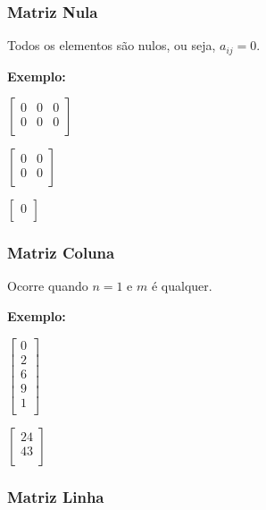 \documentclass[oneside,a4paper,12pt]{article}
\begin{document}
\subsubsection{Matriz Nula}

Todos os elementos são nulos, ou seja, $a_{ij} = 0$.

\textbf{Exemplo: }

\begin{multicols}{3}
	$
	\left[
	\begin{array}{ccc}
	0	&	0	&	0	\\
	0	&	0	&	0	\\
	\end{array}
	\right]
	$
	
	$
	\left[
	\begin{array}{cc}
	0	&	0	\\
	0	&	0	\\
	\end{array}
	\right]
	$
	
	$
	\left[
	\begin{array}{c}
	0	\\
	\end{array}
	\right]
	$
\end{multicols}

\subsubsection{Matriz Coluna}

Ocorre quando $n=1$ e $m$ é qualquer.

\textbf{Exemplo: }

\begin{multicols}{2}
	$
	\left[
	\begin{array}{c}
	0	\\
	2	\\
	6	\\
	9	\\
	1	\\
	\end{array}
	\right]
	$
	
	$
	\left[
	\begin{array}{c}
	24	\\
	43	\\
	\end{array}
	\right]
	$
	
\end{multicols}

\subsubsection{Matriz Linha}
\end{document}
